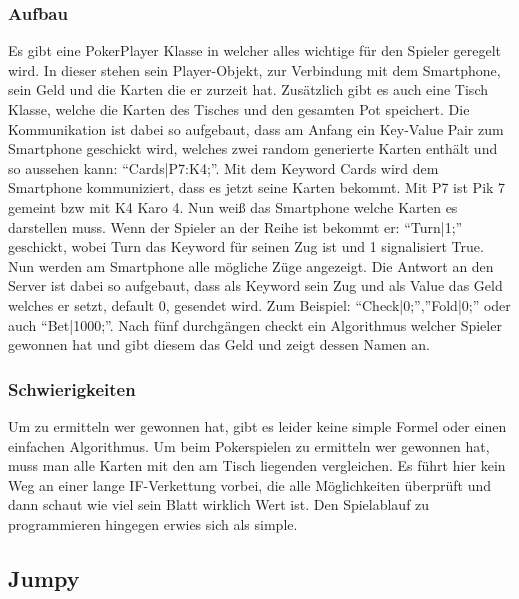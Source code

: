\subsubsection{Aufbau}
Es gibt eine PokerPlayer Klasse in welcher alles wichtige für den Spieler geregelt wird. In dieser stehen sein Player-Objekt, zur Verbindung mit dem Smartphone, sein Geld und die Karten die er zurzeit hat. Zusätzlich gibt es auch eine Tisch Klasse, welche die Karten des Tisches und den gesamten Pot speichert. Die Kommunikation ist dabei so aufgebaut, dass am Anfang ein Key-Value Pair zum Smartphone geschickt wird, welches zwei random generierte Karten enthält und so aussehen kann: “Cards|P7:K4;”. Mit dem Keyword Cards wird dem Smartphone kommuniziert, dass es jetzt seine Karten bekommt. Mit P7 ist Pik 7 gemeint bzw mit K4 Karo 4. Nun weiß das Smartphone welche Karten es darstellen muss. Wenn der Spieler an der Reihe ist bekommt er: “Turn|1;” geschickt, wobei Turn das Keyword für seinen Zug ist und 1 signalisiert True. Nun werden am Smartphone alle mögliche Züge angezeigt. Die Antwort an den Server ist dabei so aufgebaut, dass als Keyword sein Zug und als Value das Geld welches er setzt, default 0, gesendet wird. Zum Beispiel: “Check|0;”,”Fold|0;” oder auch “Bet|1000;”. Nach fünf durchgängen checkt ein Algorithmus welcher Spieler gewonnen hat und gibt diesem das Geld und zeigt dessen Namen an.
\subsubsection{Schwierigkeiten}
Um zu ermitteln wer gewonnen hat, gibt es leider keine simple Formel oder einen einfachen Algorithmus. Um beim Pokerspielen zu ermitteln wer gewonnen hat, muss man alle Karten mit den am Tisch liegenden vergleichen. Es führt hier kein Weg an einer lange IF-Verkettung vorbei, die alle Möglichkeiten überprüft und dann schaut wie viel sein Blatt wirklich Wert ist. Den Spielablauf zu programmieren hingegen erwies sich als simple.
\subsection{Jumpy} \label{jumpy}
